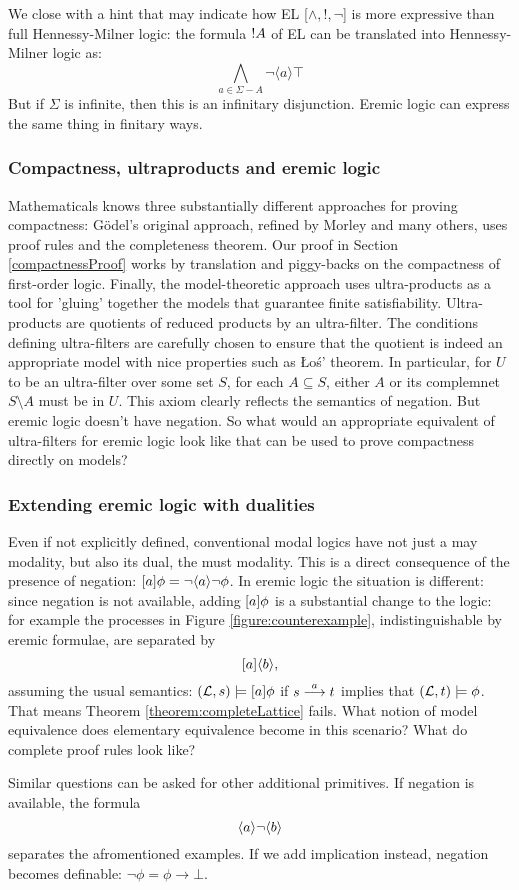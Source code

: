 We close with a hint that may indicate how EL [$\land, !, \neg$] is
more expressive than full Hennessy-Milner logic: the formula $!
A$ of EL can be translated into Hennessy-Milner logic as:
\[
\bigwedge_{a \in \Sigma - A} \neg \langle a \rangle \top
\]
But if $\Sigma$ is infinite, then this is an infinitary disjunction.
Eremic logic can express the same thing in finitary ways.

\subsubsection{Compactness, ultraproducts and eremic logic}

Mathematicals knows three substantially different approaches for
proving compactness: G\"odel's original approach, refined by Morley
and many others, uses proof rules and the completeness theorem.  Our
proof in Section \ref{compactnessProof} works by translation and
piggy-backs on the compactness of first-order logic. Finally, the
model-theoretic approach uses ultra-products as a tool for 'gluing'
together the models that guarantee finite
satisfiability. Ultra-products are quotients of reduced products by an
ultra-filter. The conditions defining ultra-filters are carefully
chosen to ensure that the quotient is indeed an appropriate model with
nice properties such as \L{}o\'{s}' theorem. In particular, for $U$ to
be an ultra-filter over some set $S$, for each $A \subseteq S$, either
$A$ or its complemnet $S\setminus A$ must be in $U$. This axiom
clearly reflects the semantics of negation. But eremic logic doesn't
have negation. So what would an appropriate equivalent of
ultra-filters for eremic logic look like that can be used to prove
compactness directly on models?

\subsubsection{Extending eremic logic with dualities}

Even if not explicitly defined, conventional modal logics have not
just a may modality, but also its dual, the must modality. This is a
direct consequence of the presence of negation: $[ a ] \phi = \neg
\langle a \rangle \neg \phi$. In eremic logic the situation is different: since
negation is not available, adding $[ a ] \phi$ is a substantial
change to the logic: for example the processes in Figure
\ref{figure:counterexample}, indistinguishable by eremic formulae, are
separated by
  \[
     [ a ] \langle b \rangle,
  \]
  assuming the usual semantics: $(\mathcal{L}, s) \models [ a ] \phi$ if
  $s \stackrel{a}{\longrightarrow} t$ implies that $(\mathcal{L}, t) \models \phi$. That means
  Theorem \ref{theorem:completeLattice} fails. What notion of model
  equivalence does elementary equivalence become in this scenario?
  What do complete proof rules look like?

  Similar questions can be asked for other additional primitives. If negation is 
  available, the formula
  \[
     \langle a \rangle \neg \langle b \rangle
  \]
  separates the afromentioned examples. If we add implication instead,
  negation becomes definable: $\neg \phi = \phi \rightarrow \bot$.




